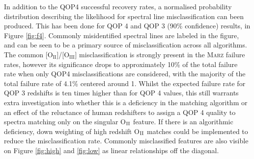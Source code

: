 \documentclass[iop]{emulateapj}
\newcommand{\marz}{\textsc{Marz}}
\begin{document}
In addition to the QOP4 successful recovery rates, a normalised probability distribution describing the likelihood for spectral line misclassification can been produced. This has been done for QOP 4 and QOP 3 (90\% confidence) results, in Figure \ref{fig:f4}. Commonly misidentified spectral lines are labeled in the figure, and can be seen to be a primary source of misclassification across all algorithms. The common [O$_{\mathrm{II}}$]/[O$_{\mathrm{III}}$] misclassification is strongly present in the \marz{} failure rates, however its significance drops to approximately 10\% of the total failure rate when only QOP4 misclassifications are considered, with the majority of the total failure rate of 4.1\% centered around 1. Whilst the expected failure rate for QOP 3 redshifts is ten times higher than for QOP 4 values, this still warrants extra investigation into whether this is a deficiency in the matching algorithm or an effect of the reluctance of human redshifters to assign a QOP 4 quality to spectra matching only on the singular O$_{\rm{II}}$ feature. If there is an algorithmic deficiency, down weighting of high redshift O$_{\rm{II}}$ matches could be implemented to reduce the misclassification rate. Commonly misclassified features are also visible on Figure \ref{fig:high} and \ref{fig:low} as linear relationships off the diagonal.\\
\end{document}
